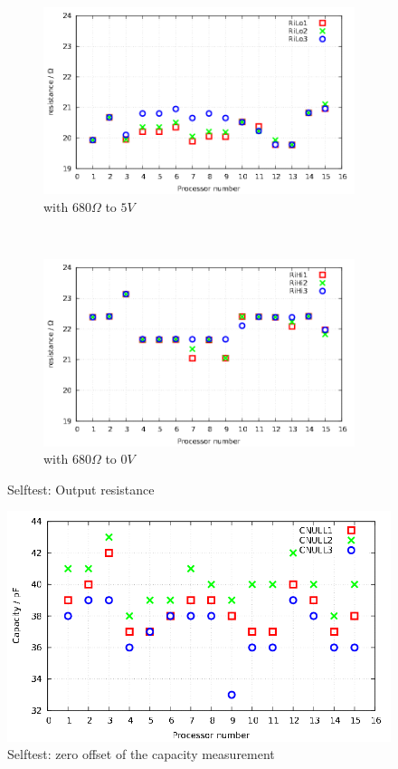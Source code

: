 \begin{figure}[H]
  \begin{subfigure}[b]{.5\textwidth}
  \centering
    \includegraphics[width=1.\textwidth]{../GNU/SelfTRiLo.pdf}
    \caption{with \(680\Omega\) to \(5V\)}
    \label{fig:SelfTRoL}
  \end{subfigure}
  ~
  \begin{subfigure}[b]{.5\textwidth}
  \centering
    \includegraphics[width=1.\textwidth]{../GNU/SelfTRiHi.pdf}
    \caption{with \(680\Omega\) to \(0V\)}
    \label{fig:SelfTRoH}
  \end{subfigure}
  \caption{Selftest: Output resistance}
\end{figure}

\begin{figure}[H]
  \centering
  \includegraphics[width=.9\textwidth]{../GNU/SelfTcap0.pdf}
  \caption{Selftest: zero offset of the capacity measurement}
  \label{fig:SelfTcap}
\end{figure}

